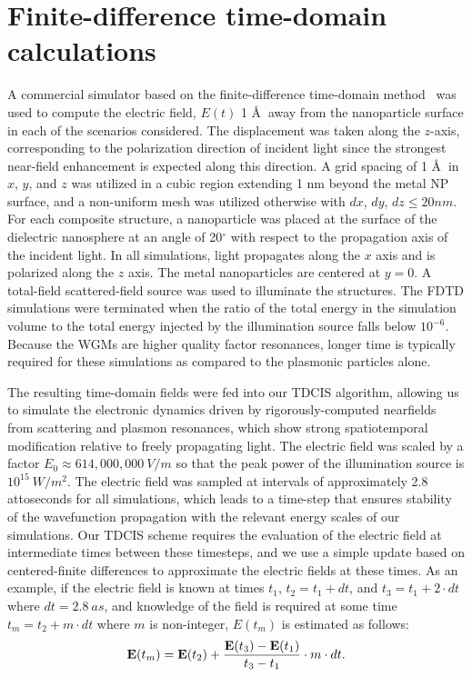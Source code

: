 \documentclass[journal=jpclcd,manuscript=suppinfo]{achemso}
\begin{document}
\section{Finite-difference time-domain calculations}
A commercial simulator based on the finite-difference time-domain method~\cite{Lumerical} was used to compute the electric field, $E(t)$
1 \AA $\:$  
away from the nanoparticle surface in each of the scenarios considered.  The displacement
was taken along the $z$-axis, corresponding to the polarization direction of incident light since the strongest
near-field enhancement is expected along this direction.  A grid spacing of 1 \AA $\:$  
in $x$, $y$, and $z$ was utilized
in a cubic region extending 1 nm beyond the metal NP surface, and a non-uniform mesh was utilized otherwise with $dx$, $dy$, $dz \leq 20 nm$.
For each composite structure, a nanoparticle was placed at the surface of the dielectric nanosphere at an angle of
20$^{\circ}$ with respect to the propagation axis of the incident light. In all simulations, light propagates
along the $x$ axis and is polarized along the $z$ axis.  The metal nanoparticles are centered at $y=0$.  
A total-field scattered-field source was used to illuminate the structures.  The FDTD simulations were terminated when the 
ratio of the total energy in the simulation volume to the total energy injected by the illumination source falls below
$10^{-6}$.  Because the WGMs are higher quality factor resonances, longer time is typically required for these simulations
as compared to the plasmonic particles alone.  

The resulting time-domain fields were fed into our TDCIS algorithm, allowing us to simulate the electronic dynamics
driven by rigorously-computed nearfields from scattering and plasmon resonances, which show strong spatiotemporal modification relative
to freely propagating light.  The electric field was scaled by a factor $E_0 \approx 614,000,000 \: V/m$ so that the peak power
of the illumination source is $10^{15} \: W/m^2$.  The electric field was sampled at intervals of approximately 2.8 attoseconds for all simulations, which leads
to a time-step that ensures stability of
the wavefunction propagation with the relevant energy scales of our simulations.  Our TDCIS scheme
requires the evaluation of the electric field at intermediate times between these timesteps, and we use a simple update
based on centered-finite differences to approximate the electric fields at these times.  As an example, if the 
electric field is known at times $t_1$, $t_2 = t_1 + dt$, and $t_3 = t_1 + 2\cdot dt$ where $dt = 2.8 \: as$, and knowledge
of the field is required at some time $t_m = t_2 + m\cdot dt$ where $m$ is non-integer, $E(t_m)$ is estimated as follows: 
\begin{equation}
{\bf E}(t_m) =  {\bf E}(t_2) + \frac{{\bf E}(t_3)-{\bf E}(t_1) }{t_3 - t_1 } \cdot m\cdot dt.
\end{equation}
\end{document}
